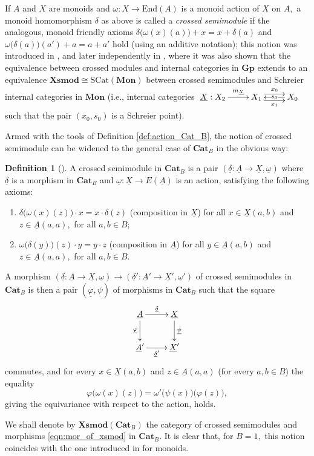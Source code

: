 \documentclass[11pt]{amsart}
\theoremstyle{plain}
\theoremstyle{definition}
\newtheorem{definition}[subsubsection]{Definition}
\theoremstyle{remark}
\newcommand{\un}{\underline}
\begin{document}
If $A$ and $X$ are monoids and $\omega\colon X\rightarrow\mathrm{End}(A)$ is a monoid action of $X$ on $A,$ a monoid homomorphism $\delta$ as above is called a \emph{crossed semimodule} if the analogous, monoid friendly axioms $\delta\big(\omega(x)(a)\big)+x=x+\delta(a)$ and $\omega\big(\delta(a)\big)(a')+a=a+a'$ hold (using an additive notation); this notion was introduced in \cite{JS}, and later independently in \cite{crossed-semimodules}, where it was also shown that the equivalence between crossed modules and internal categories in $\mathbf{Gp}$ extends to an equivalence $\mathbf{Xsmod}\cong\mathrm{SCat}(\mathbf{Mon})$ between crossed semimodules and Schreier internal categories in $\mathbf{Mon}$ (i.e., internal categories $\xymatrix{{\underline{X}:X_2} \ar[r]^-{m_{\un{X}}} &{X_1} \ar@<.9ex>[r]^-{x_0} \ar@<-.9ex>[r]_-{x_1} &{X_0} \ar[l]|-{s_0}}$ such that the pair $(x_0,s_0)$ is a Schreier point).

Armed with the tools of Definition \ref{def:action_Cat_B}, the notion of crossed semimodule can be widened to the general case of $\mathbf{Cat}_B$ in the obvious way:
\begin{definition}[\cite{a1}]
\label{def:mor_of_xsmod}
A crossed semimodule in $\mathbf{Cat}_B$ is a pair $(\un{\delta}\colon\un{A}\rightarrow\un{X},\un{\omega})$ where $\un{\delta}$ is a morphism in $\mathbf{Cat}_B$ and $\un{\omega}\colon\un{X}\rightarrow E(\un{A})$ is an action, satisfying the following axioms:
\begin{enumerate}
\item $\delta\big(\omega(x)(z)\big)\cdot x=x\cdot \delta(z)$ (composition in $\un{X}$) for all $x\in\un{X}(a,b)$ and $z\in\un{A}(a,a),$ for all $a,b\in B;$
\item $\omega\big(\delta(y)\big)(z)\cdot y=y\cdot z$ (composition in $\un{A}$) for all $y\in\un{A}(a,b)$ and $z\in\un{A}(a,a),$ for all $a,b\in B.$
\end{enumerate}
A morphism $(\un{\delta}\colon\un{A}\rightarrow\un{X},\un{\omega})\rightarrow(\un{\delta}'\colon\un{A}'\rightarrow\un{X}',\un{\omega}')$ of crossed semimodules in $\mathbf{Cat}_B$ is then a pair $(\un{\varphi},\un{\psi})$ of morphisms in $\mathbf{Cat}_B$ such that the square
\begin{equation}
\label{eqn:mor_of_xsmod}
\begin{aligned}
\xymatrix{
{\un{A}} \ar[d]_-{\un{\varphi}} \ar[r]^-{\un{\delta}} &{\un{X}} \ar[d]^-{\un{\psi}} \\
{\un{A}'} \ar[r]_-{\un{\delta}'} &{\un{X}'}
}
\end{aligned}
\end{equation}
commutes, and for every $x\in\un{X}(a,b)$ and $z\in\un{A}(a,a)$ (for every $a,b\in B$) the equality
\begin{equation*}
\varphi\big(\omega(x)(z)\big)=\omega'\big(\psi(x)\big)\big(\varphi(z)\big),
\end{equation*}
giving the equivariance with respect to the action, holds.
\end{definition}
We shall denote by $\mathbf{Xsmod}(\mathbf{Cat}_B)$ the category of crossed semimodules and morphisms \eqref{eqn:mor_of_xsmod} in $\mathbf{Cat}_B.$ It is clear that, for $B=1,$ this notion coincides with the one introduced in \cite{JS} for monoids.
\end{document}
